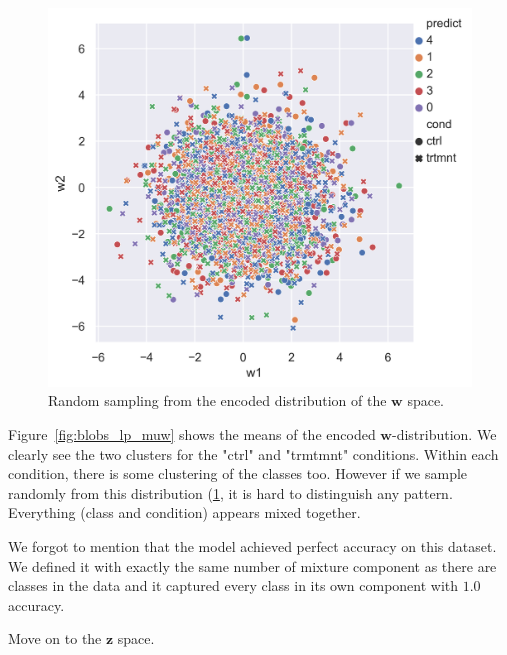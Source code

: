\documentclass[11pt, a4paper]{report}
\theoremstyle{plain}
\theoremstyle{definition}
\theoremstyle{remark}
\newcommand{\z}{\mathbf{z}}
\newcommand{\w}{\mathbf{w}}
\begin{document}
\begin{figure}[h]
\centering
\includegraphics[width=1.1\textwidth]{images/blobs_cgmvae_learnedprior_w.png}
\caption{Random sampling from the encoded distribution of the $\w$ space. 
}
\label{fig:blobs_lp_w}
\end{figure}

Figure~\ref{fig:blobs_lp_muw} shows the means of the encoded $\w$-distribution.
We clearly see the two clusters for the "ctrl" and "trmtmnt" conditions.
Within each condition, there is some clustering of the classes too.
However if we sample randomly from this distribution (\ref{fig:blobs_lp_w}, it
is hard to distinguish any pattern. Everything (class and condition) appears
mixed together.


We forgot to mention that the model achieved perfect accuracy on this dataset.
We defined it with exactly the same number of mixture component as there are
classes in the data and it captured every class in its own component with $1.0$
accuracy.

Move on to the $\z$ space.
\end{document}
